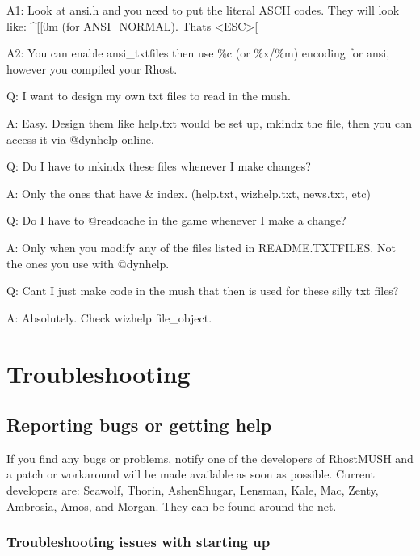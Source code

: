 \documentclass[letterpaper,10pt,english]{sphinxmanual}
\begin{document}
\sphinxAtStartPar
A1: Look at ansi.h and you need to put the literal ASCII codes.  They will look like: \textasciicircum{}{[}{[}0m (for ANSI\_NORMAL).  That\textquotesingle{}s \textless{}ESC\textgreater{}{[}

\sphinxAtStartPar
A2: You can enable ansi\_txtfiles then use \%c (or \%x/\%m) encoding for ansi, however you compiled your Rhost.

\sphinxAtStartPar
Q:  I want to design my own txt files to read in the mush.

\sphinxAtStartPar
A:  Easy.  Design them like help.txt would be set up, mkindx the file, then you can access it via @dynhelp online.

\sphinxAtStartPar
Q:  Do I have to mkindx these files whenever I make changes?

\sphinxAtStartPar
A:  Only the ones that have \textquotesingle{}\& \textquotesingle{} index. (help.txt, wizhelp.txt, news.txt, etc)

\sphinxAtStartPar
Q:  Do I have to @readcache in the game whenever I make a change?

\sphinxAtStartPar
A:  Only when you modify any of the files listed in README.TXTFILES.  Not the ones you use with @dynhelp.

\sphinxAtStartPar
Q:  Can\textquotesingle{}t I just make code in the mush that then is used for these silly txt files?

\sphinxAtStartPar
A:  Absolutely.  Check \textquotesingle{}wizhelp file\_object\textquotesingle{}.


\chapter{Troubleshooting}
\label{\detokenize{troubleshooting:troubleshooting}}\label{\detokenize{troubleshooting::doc}}

\section{Reporting bugs or getting help}
\label{\detokenize{troubleshooting:reporting-bugs-or-getting-help}}
\sphinxAtStartPar
If you find any bugs or problems, notify one of the developers of RhostMUSH and
a patch or workaround will be made available as soon as possible.  Current
developers are:  Seawolf, Thorin, Ashen\sphinxhyphen{}Shugar, Lensman, Kale, Mac, Zenty,
Ambrosia, Amos, and Morgan.  They can be found around the net.


\subsection{Troubleshooting issues with starting up}
\label{\detokenize{troubleshooting:troubleshooting-issues-with-starting-up}}
\end{document}
